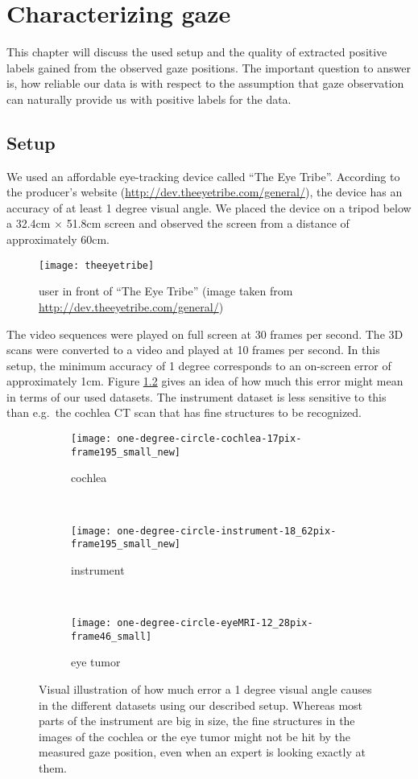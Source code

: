 \chapter{Characterizing gaze}
\label{chap:characterizing-gaze}
This chapter will discuss the used setup and the quality of extracted positive labels gained from the observed gaze positions. The important question to answer is, how reliable our data is with respect to the assumption that gaze observation can naturally provide us with positive labels for the data. 

\section{Setup}
We used an affordable eye-tracking device called ``The Eye Tribe''. 
According to the producer's website (\url{http://dev.theeyetribe.com/general/}), the device has an accuracy of at least 1 degree visual angle. We placed the device on a tripod below a 32.4cm $\times$ 51.8cm screen and observed the screen from a distance of approximately 60cm.

\begin{figure}[ht]
	\centering

	\texttt{[image: theeyetribe]}	
	\caption{user in front of ``The Eye Tribe'' (image taken from \url{http://dev.theeyetribe.com/general/})}
	\label{fig:theeyetribe}
\end{figure}

The video sequences were played on full screen at 30 frames per second. 
The 3D scans were converted to a video and played at 10 frames per second. 
In this setup, the minimum accuracy of 1 degree corresponds to an on-screen error of approximately 1cm. 
Figure \ref{fig:onedegreecircle} gives an idea of how much this error might mean in terms of our used datasets.
The instrument dataset is less sensitive to this than e.g.\ the cochlea CT scan that has fine structures to be recognized.

\begin{figure}[ht]
	\centering
	\begin{subfigure}[h]{0.31\textwidth}
		\texttt{[image: one-degree-circle-cochlea-17pix-frame195\_small\_new]}	
		\caption*{cochlea}
	\end{subfigure}
	~
	\begin{subfigure}[h]{0.31\textwidth}
		\texttt{[image: one-degree-circle-instrument-18\_62pix-frame195\_small\_new]}
		\caption*{instrument}
	\end{subfigure}
	~
	\begin{subfigure}[h]{0.31\textwidth}
		\texttt{[image: one-degree-circle-eyeMRI-12\_28pix-frame46\_small]}	
		\caption*{eye tumor}
	\end{subfigure}
	\caption{Visual illustration of how much error a 1 degree visual angle causes in the different datasets using our described setup. Whereas most parts of the instrument are big in size, the fine structures in the images of the cochlea or the eye tumor might not be hit by the measured gaze position, even when an expert is looking exactly at them.}
	\label{fig:onedegreecircle}
\end{figure}

